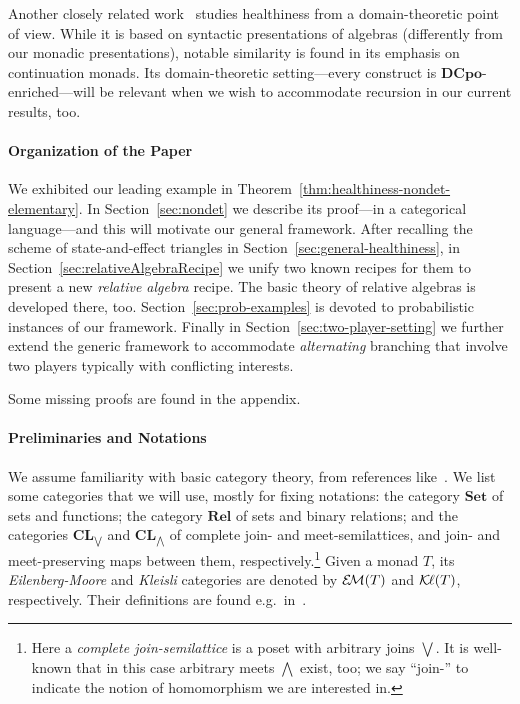 \documentclass[9pt, preprint]{sigplanconf}
\theoremstyle{theorem}
\theoremstyle{definition}
\newcommand{\Set}{\mathbf{Set}}
\newcommand{\Rel}{\mathbf{Rel}}
\newcommand{\CL}{\mathbf{CL}}
\newcommand{\EM}{\mathcal{E}{\kern-.5ex}\mathcal{M}}
\newcommand{\Kl}{\mathcal{K}{\kern-.2ex}\ell}
\newcommand{\biglor}{\bigvee}
\newcommand{\bigland}{\bigwedge}
\begin{document}
Another closely related work~\cite{Keimel15}
studies healthiness from a domain-theoretic point of
view. While it is based on syntactic presentations of algebras
(differently from our monadic presentations), notable similarity
is found in its emphasis on continuation monads. Its domain-theoretic
setting---every construct is $\mathbf{DCpo}$-enriched---will be relevant
when we wish to accommodate recursion in our current results, too.


\paragraph{Organization of the Paper}
We exhibited our leading example in
Theorem~\ref{thm:healthiness-nondet-elementary}. In
Section~\ref{sec:nondet} we describe its proof---in a categorical
language---and this will motivate our general framework. After
recalling the scheme of state-and-effect triangles
in
Section~\ref{sec:general-healthiness}, in
Section~\ref{sec:relativeAlgebraRecipe} we unify  two known recipes for them to present a
new \emph{relative algebra} recipe. The basic theory of relative
algebras is developed there, too. Section~\ref{sec:prob-examples} is devoted
to probabilistic  instances of our framework. Finally in Section~\ref{sec:two-player-setting}
we
further extend the generic framework to accommodate \emph{alternating}
branching that involve two players typically with conflicting interests.

Some missing proofs are found in the appendix.




\paragraph{Preliminaries and Notations}
We assume familiarity with basic category theory, from references
like~\cite{MacLane71,BarrW85}. We list some categories that we will use, mostly for fixing notations:
 the category $\Set$  of sets and functions;
 the category $\Rel$  of sets and binary relations;
 and the categories
 $\CL_{\biglor}$ and
 $\CL_{\bigland}$ of complete join- and meet-semilattices, and
 join- and meet-preserving maps between them,
 respectively.\footnote{Here a \emph{complete join-semilattice} is a
 poset with arbitrary joins $\biglor$. It is well-known that in this case
 arbitrary meets $\bigland$ exist, too; we say ``join-'' to indicate the notion of
homomorphism we are interested in.
 } Given a monad $T$,
 its \emph{Eilenberg-Moore} and \emph{Kleisli} categories are denoted
 by $\EM(T)$ and $\Kl(T)$, respectively. Their definitions are found
 e.g.\ in~\cite{MacLane71,BarrW85}.
\end{document}
